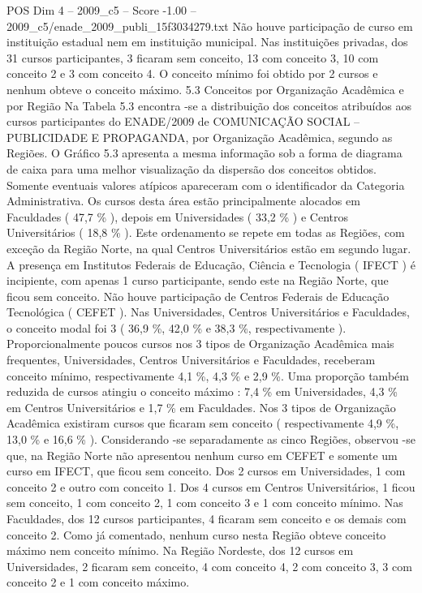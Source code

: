 \begin{textsample}{POS Dim 4 – 2009\_c5 – Score -1.00 – 2009\_c5/enade\_2009\_publi\_15f3034279.txt}
Não houve participação de curso em instituição estadual nem em instituição municipal.
Nas instituições privadas, dos 31 cursos participantes, 3 ficaram sem conceito, 13 com conceito 3, 10 com conceito 2 e 3 com conceito 4.
O conceito mínimo foi obtido por 2 cursos e nenhum obteve o conceito máximo. 5.3 Conceitos por Organização Acadêmica e por Região Na Tabela 5.3 encontra -se a distribuição dos conceitos atribuídos aos cursos participantes do ENADE/2009 de COMUNICAÇÃO SOCIAL – PUBLICIDADE E PROPAGANDA, por Organização Acadêmica, segundo as Regiões.
O Gráfico 5.3 apresenta a mesma informação sob a forma de diagrama de caixa para uma melhor visualização da dispersão dos conceitos obtidos.
Somente eventuais valores atípicos apareceram com o identificador da Categoria Administrativa.
Os cursos desta área estão principalmente alocados em Faculdades ( 47,7 \% ), depois em Universidades ( 33,2 \% ) e Centros Universitários ( 18,8 \% ).
Este ordenamento se repete em todas as Regiões, com exceção da Região Norte, na qual Centros Universitários estão em segundo lugar.
A presença em Institutos Federais de Educação, Ciência e Tecnologia ( IFECT ) é incipiente, com apenas 1 curso participante, sendo este na Região Norte, que ficou sem conceito.
Não houve participação de Centros Federais de Educação Tecnológica ( CEFET ).
Nas Universidades, Centros Universitários e Faculdades, o conceito modal foi 3 ( 36,9 \%, 42,0 \% e 38,3 \%, respectivamente ).
Proporcionalmente poucos cursos nos 3 tipos de Organização Acadêmica mais frequentes, Universidades, Centros Universitários e Faculdades, receberam conceito mínimo, respectivamente 4,1 \%, 4,3 \% e 2,9 \%.
Uma proporção também reduzida de cursos atingiu o conceito máximo : 7,4 \% em Universidades, 4,3 \% em Centros Universitários e 1,7 \% em Faculdades.
Nos 3 tipos de Organização Acadêmica existiram cursos que ficaram sem conceito ( respectivamente 4,9 \%, 13,0 \% e 16,6 \% ).
Considerando -se separadamente as cinco Regiões, observou -se que, na Região Norte não apresentou nenhum curso em CEFET e somente um curso em IFECT, que ficou sem conceito.
Dos 2 cursos em Universidades, 1 com conceito 2 e outro com conceito 1.
Dos 4 cursos em Centros Universitários, 1 ficou sem conceito, 1 com conceito 2, 1 com conceito 3 e 1 com conceito mínimo.
Nas Faculdades, dos 12 cursos participantes, 4 ficaram sem conceito e os demais com conceito 2.
Como já comentado, nenhum curso nesta Região obteve conceito máximo nem conceito mínimo.
Na Região Nordeste, dos 12 cursos em Universidades, 2 ficaram sem conceito, 4 com conceito 4, 2 com conceito 3, 3 com conceito 2 e 1 com conceito máximo.

\end{textsample}
